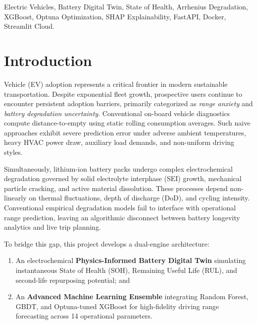 \documentclass[journal]{IEEEtran}
\begin{document}
\begin{IEEEkeywords}
Electric Vehicles, Battery Digital Twin, State of Health, Arrhenius Degradation, XGBoost, Optuna Optimization, SHAP Explainability, FastAPI, Docker, Streamlit Cloud.
\end{IEEEkeywords}

\section{Introduction}
 Vehicle (EV) adoption represents a critical frontier in modern sustainable transportation. Despite exponential fleet growth, prospective users continue to encounter persistent adoption barriers, primarily categorized as \textit{range anxiety} and \textit{battery degradation uncertainty}. Conventional on-board vehicle diagnostics compute distance-to-empty using static rolling consumption averages. Such naive approaches exhibit severe prediction error under adverse ambient temperatures, heavy HVAC power draw, auxiliary load demands, and non-uniform driving styles.

Simultaneously, lithium-ion battery packs undergo complex electrochemical degradation governed by solid electrolyte interphase (SEI) growth, mechanical particle cracking, and active material dissolution. These processes depend non-linearly on thermal fluctuations, depth of discharge (DoD), and cycling intensity. Conventional empirical degradation models fail to interface with operational range prediction, leaving an algorithmic disconnect between battery longevity analytics and live trip planning.

To bridge this gap, this project develops a dual-engine architecture:
\begin{enumerate}
    \item An electrochemical \textbf{Physics-Informed Battery Digital Twin} simulating instantaneous State of Health (SOH), Remaining Useful Life (RUL), and second-life repurposing potential; and
    \item An \textbf{Advanced Machine Learning Ensemble} integrating Random Forest, GBDT, and Optuna-tuned XGBoost for high-fidelity driving range forecasting across 14 operational parameters.
\end{enumerate}
\end{document}
